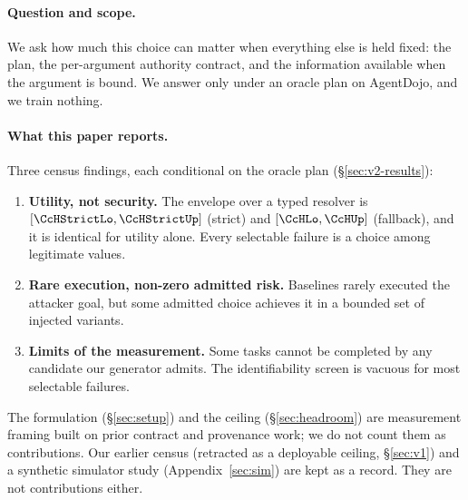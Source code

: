 \documentclass{article}
\begin{document}
\paragraph{Question and scope.}
We ask how much this choice can matter when everything else is held fixed:
the plan, the per-argument authority contract, and the information available
when the argument is bound. We answer only under an oracle plan on
AgentDojo, and we train nothing.

\paragraph{What this paper reports.}
Three census findings, each conditional on the oracle plan
(\S\ref{sec:v2-results}):
\begin{enumerate}
\item \textbf{Utility, not security.} The envelope over a typed resolver is
$[\CcHStrictLo,\CcHStrictUp]$ (strict) and $[\CcHLo,\CcHUp]$ (fallback), and
it is identical for utility alone. Every selectable failure is a choice
among legitimate values.
\item \textbf{Rare execution, non-zero admitted risk.} Baselines rarely
executed the attacker goal, but some admitted choice achieves it in a
bounded set of injected variants.
\item \textbf{Limits of the measurement.} Some tasks cannot be completed by
any candidate our generator admits. The identifiability screen is vacuous
for most selectable failures.
\end{enumerate}
The formulation (\S\ref{sec:setup}) and the ceiling
(\S\ref{sec:headroom}) are measurement framing built on prior contract and
provenance work; we do not count them as contributions. Our earlier census
(retracted as a deployable ceiling, \S\ref{sec:v1}) and a synthetic
simulator study (Appendix~\ref{sec:sim}) are kept as a record. They are not
contributions either.
\end{document}
